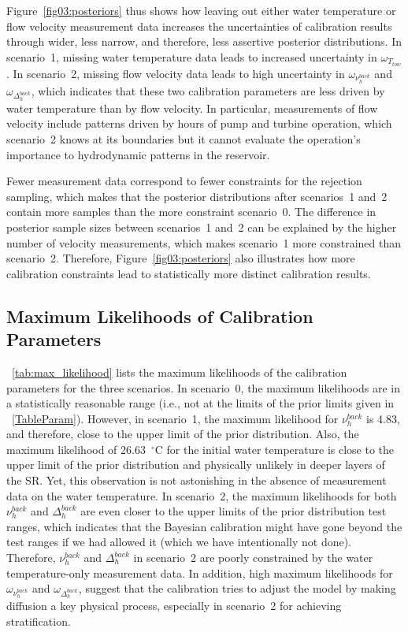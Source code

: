 \documentclass[draft,linenumbers,onecolumn]{agujournal2019} %
\begin{document}
Figure~\ref{fig03:posteriors} thus shows how leaving out either water temperature or flow velocity measurement data increases the uncertainties of calibration results through wider, less narrow, and therefore, less assertive posterior distributions. In scenario~1, missing water temperature data leads to increased uncertainty in \(\omega_{T_{tow}}\). In scenario~2, missing flow velocity data leads to high uncertainty in \(\omega_{\nu_{h}^{back}}\) and \(\omega_{\Delta_{h}^{back}}\), which indicates that these two calibration parameters are less driven by water temperature than by flow velocity. In particular, measurements of flow velocity include patterns driven by hours of pump and turbine operation, which scenario~2 knows at its boundaries but it cannot evaluate the operation's importance to hydrodynamic patterns in the reservoir.

Fewer measurement data correspond to fewer constraints for the rejection sampling, which makes that the posterior distributions after scenarios~1 and~2 contain more samples than the more constraint scenario~0. The difference in posterior sample sizes between scenarios~1 and~2 can be explained by the higher number of velocity measurements, which makes scenario~1 more constrained than scenario~2. Therefore, Figure~\ref{fig03:posteriors} also illustrates how more calibration constraints lead to statistically more distinct calibration results.

\subsection{Maximum Likelihoods of Calibration Parameters}

\tablename{~\ref{tab:max_likelihood}} lists the maximum likelihoods of the calibration parameters for the three scenarios. In scenario~0, the maximum likelihoods are in a statistically reasonable range (i.e., not at the limits of the prior limits given in \tablename{~\ref{TableParam}}). However, in scenario~1, the maximum likelihood for $\nu_{h}^{back}$ is 4.83, and therefore, close to the upper limit of the prior distribution. Also, the maximum likelihood of 26.63~$^{\circ}$C for the initial water temperature is close to the upper limit of the prior distribution and physically unlikely in deeper layers of the SR. Yet, this observation is not astonishing in the absence of measurement data on the water temperature. In scenario~2, the maximum likelihoods for both $\nu_{h}^{back}$ and $\Delta_{h}^{back}$ are even closer to the upper limits of the prior distribution test ranges, which indicates that the Bayesian calibration might have gone beyond the test ranges if we had allowed it (which we have intentionally not done). Therefore, $\nu_{h}^{back}$ and $\Delta_{h}^{back}$ in scenario~2 are poorly constrained by the water temperature-only measurement data. In addition, high maximum likelihoods for $\omega_{\nu_{h}^{back}}$ and $\omega_{\Delta_{h}^{back}}$, suggest that the calibration tries to adjust the model by making diffusion a key physical process, especially in scenario~2 for achieving stratification.
\end{document}
